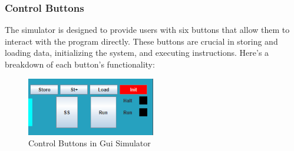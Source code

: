 \documentclass[10pt]{article}
\begin{document}
\subsubsection{Control Buttons}
The simulator is designed to provide users with six buttons that allow them to interact with the program directly. 
These buttons are crucial in storing and loading data, initializing the system, and executing instructions. 
Here's a breakdown of each button's functionality:
\begin{figure}[H]
  \centering
  \includegraphics[width=0.5\textwidth]{Pics/Fig3.png}
  \caption{Control Buttons in Gui Simulator}
  \label{fig:ctrl_button}
\end{figure}
\end{document}
